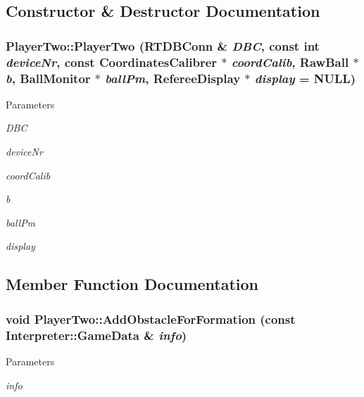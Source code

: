 \subsection{Constructor \& Destructor Documentation}
\hypertarget{classPlayerTwo_ac69719e70c78f7dffa36300f833955b1}{
\subsubsection[{PlayerTwo}]{\setlength{\rightskip}{0pt plus 5cm}PlayerTwo::PlayerTwo (RTDBConn \& {\em DBC}, \/  const int {\em deviceNr}, \/  const {\bf CoordinatesCalibrer} $\ast$ {\em coordCalib}, \/  RawBall $\ast$ {\em b}, \/  {\bf BallMonitor} $\ast$ {\em ballPm}, \/  {\bf RefereeDisplay} $\ast$ {\em display} = {\ttfamily NULL})}}
\label{classPlayerTwo_ac69719e70c78f7dffa36300f833955b1}

\begin{DoxyParams}{Parameters}
\item[{\em DBC}]\item[{\em deviceNr}]\item[{\em coordCalib}]\item[{\em b}]\item[{\em ballPm}]\item[{\em display}]\end{DoxyParams}


\subsection{Member Function Documentation}
\hypertarget{classPlayerTwo_a9e3341541658f54a2dfb0491a774b4d4}{
\subsubsection[{AddObstacleForFormation}]{\setlength{\rightskip}{0pt plus 5cm}void PlayerTwo::AddObstacleForFormation (const {\bf Interpreter::GameData} \& {\em info})}}
\label{classPlayerTwo_a9e3341541658f54a2dfb0491a774b4d4}

\begin{DoxyParams}{Parameters}
\item[{\em info}]\end{DoxyParams}



